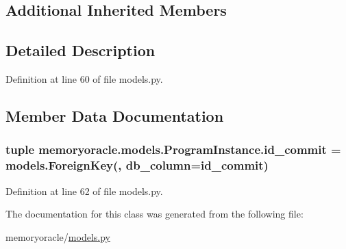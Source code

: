 \subsection*{Additional Inherited Members}


\subsection{Detailed Description}


Definition at line 60 of file models.\+py.



\subsection{Member Data Documentation}
\hypertarget{classmemoryoracle_1_1models_1_1ProgramInstance_a9fc40c28ec43657e55c48317d7ccf375}{}
\subsubsection[{id\+\_\+commit}]{\setlength{\rightskip}{0pt plus 5cm}tuple memoryoracle.\+models.\+Program\+Instance.\+id\+\_\+commit = models.\+Foreign\+Key(\textquotesingle{}, db\+\_\+column=\textquotesingle{}id\+\_\+commit\textquotesingle{})\hspace{0.3cm}{\ttfamily [static]}}\label{classmemoryoracle_1_1models_1_1ProgramInstance_a9fc40c28ec43657e55c48317d7ccf375}


Definition at line 62 of file models.\+py.



The documentation for this class was generated from the following file\+:\begin{DoxyCompactItemize}
\item 
memoryoracle/\hyperlink{models_8py}{models.\+py}\end{DoxyCompactItemize}
